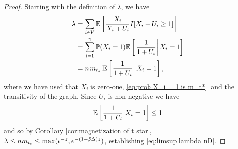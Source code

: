 	\begin{proof}
		Starting with the definition of $\lambda$, we have
		\begin{align}
			\lambda &= \sum_{i \in V} \mathbb{E}\left[\frac{X_i}{X_i + U_i} I[ X_i + U_i \geq 1] \right]\\
				&= \sum_{i = 1}^n \mathbb{P}(X_i = 1) \mathbb{E} \left[\left.\frac{1}{1 + U_i}\right| X_i = 1\right]\\
				&= n \, m_{t_*} \, \mathbb{E} \left[\left.\frac{1}{1 + U_i}\right| X_i = 1\right],
		\end{align}
		where we have used that $X_i$ is zero-one, \eqref{eq:prob X_i = 1 is m_t*}, and the transitivity of the graph.
		Since $U_i$ is non-negative we have
		\begin{align}
			\mathbb{E} \left[\frac{1}{1 + U_i}| X_i = 1\right] \leq 1
		\end{align}
		and so by Corollary \ref{cor:magnetization of t star}, $\lambda \leq n m_{t_*} \leq \max(e^{-z}, e^{-(1 - \beta\Delta)z})$, establishing \eqref{eq:limsup lambda nD}.


\end{proof}
